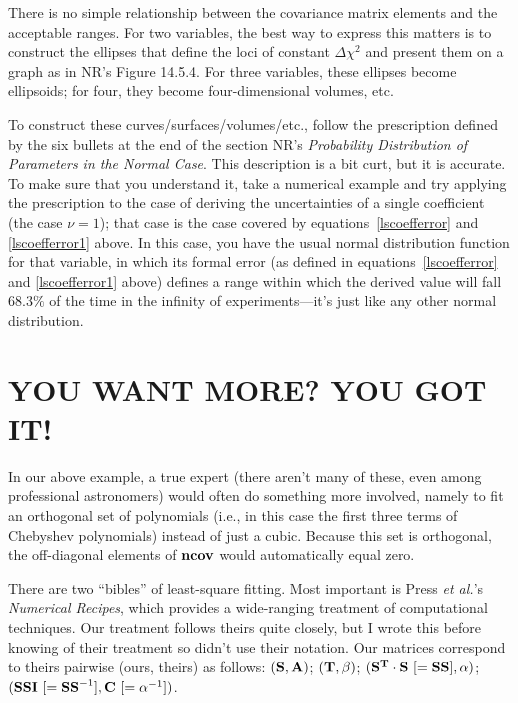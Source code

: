 {{	There is no simple relationship between the covariance matrix
elements and the acceptable ranges.  For two variables, the best way to
express this matters is to construct the ellipses that define the loci
of constant $\Delta \chi^2$ and present them on a graph as in NR's
Figure 14.5.4.  For three variables, these ellipses become ellipsoids;
for four, they become four-dimensional volumes, etc. 

	To construct these curves/surfaces/volumes/etc., follow the
prescription defined by the six bullets at the end of the section NR's
{\it Probability Distribution of Parameters in the Normal Case}.  This
description is a bit curt, but it is accurate.  To make sure that you
understand it, take a numerical example and try applying the
prescription to the case of deriving the uncertainties of a single
coefficient (the case $\nu = 1$); that case is the case covered by
equations~\ref{lscoefferror} and \ref{lscoefferror1} above.  In this
case, you have the usual normal distribution function for that variable,
in which its formal error (as defined in equations~\ref{lscoefferror}
and \ref{lscoefferror1} above) defines a range within which the derived
value will fall $68.3\%$ of the time in the infinity of
experiments---it's just like any other normal distribution. 

\section{YOU WANT MORE? YOU GOT IT!}

	In our above example, a true expert (there aren't many of these,
even among professional astronomers) would often do something more
involved, namely to fit an orthogonal set of polynomials (i.e., in this
case the first three terms of Chebyshev polynomials) instead of just a
cubic.  Because this set is orthogonal, the off-diagonal elements of
${\bf ncov}$ would automatically equal zero. 

	There are two ``bibles'' of least-square fitting.  Most
important is Press {\it et al.}'s {\it Numerical Recipes}, which
provides a wide-ranging treatment of computational techniques.  Our
treatment follows theirs quite closely, but I wrote this before knowing
of their treatment so didn't use their notation.  Our matrices
correspond to theirs pairwise (ours, theirs) as follows: $({\bf S},{\bf
A})$; $({\bf T},{\bf \beta})$; $({\bf S^T \cdot S} \ [= {\bf SS}],{\bf
\alpha})$; $({\bf SSI} \ [= {\bf SS}^{-1}],{\bf C} \ [= {\bf
\alpha}^{-1}])$. 

}}
